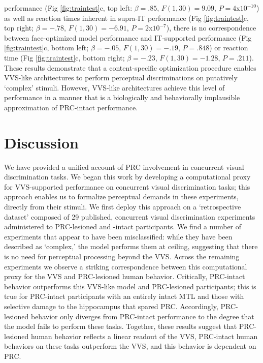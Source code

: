\documentclass[11pt]{article}
\begin{document}
performance (Fig \ref{fig:traintest}c, top left: $\beta = .85$, $F(1,30) = 9.09$, $P = 4$x$10^{-10}$) as well as reaction times inherent in supra-IT performance (Fig \ref{fig:traintest}c, top right; $\beta = -.78$, $F(1,30) = -6.91$, $P = 2$x$10^{-7}$), there is no correspondence between face-optimized model performance and IT-supported performance (Fig \ref{fig:traintest}c, bottom left; $\beta = -.05$, $F(1, 30) = -.19$, $P = .848$) or reaction time (Fig \ref{fig:traintest}c, bottom right; $\beta = -.23$, $F(1, 30) = -1.28$, $P = .211$). These results demonstrate that a content-specific optimization procedure enables VVS-like architectures to perform perceptual discriminations on putatively `complex' stimuli. However, VVS-like architectures achieve this level of performance in a manner that is a biologically and behaviorally implausible approximation of PRC-intact performance.

\section{Discussion}

We have provided a unified account of PRC involvement in concurrent visual discrimination tasks. We began this work by developing a computational proxy for VVS-supported performance on concurrent visual discrimination tasks; this approach enables us to formalize perceptual demands in these experiments, directly from their stimuli. We first deploy this approach on a `retrospective dataset' composed of 29 published, concurrent visual discrimination experiments administered to PRC-lesioned and -intact participants. We find a number of experiments that appear to have been misclassified: while they have been described as `complex,' the model performs them at ceiling, suggesting that there is no need for perceptual processing beyond the VVS. Across the remaining experiments we observe a striking correspondence between this computational proxy for the VVS and PRC-lesioned human behavior. Critically, PRC-intact behavior outperforms this VVS-like model and PRC-lesioned participants; this is true for PRC-intact participants with an entirely intact MTL and those with selective damage to the hippocampus that spared PRC. Accordingly, PRC-lesioned behavior only diverges from PRC-intact performance to the degree that the model fails to perform these tasks. Together, these results suggest that PRC-lesioned human behavior reflects a linear readout of the VVS, PRC-intact human behaviors on these tasks outperform the VVS, and this behavior is dependent on PRC.
\end{document}
